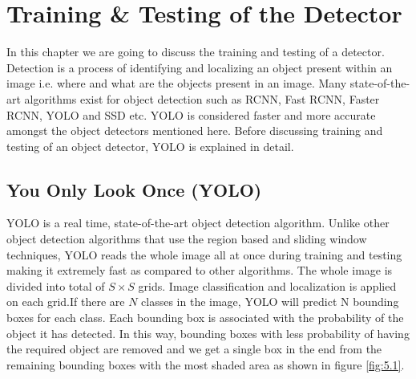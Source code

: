 \chapter{Training \& Testing of the
Detector}
\label{Chapter 5}
In this chapter we are going to discuss the training and testing of a detector. Detection is a process of identifying and localizing an object present within an image i.e. where and what are the objects present in an image. Many state-of-the-art algorithms exist for object detection such as RCNN, Fast RCNN, Faster RCNN, YOLO and SSD etc. YOLO is considered faster and more accurate amongst the object detectors mentioned here. Before discussing training and testing of an object detector, YOLO  is explained in detail.
\section{You Only Look Once (YOLO)}
YOLO is a real time, state-of-the-art object detection algorithm. Unlike other object detection algorithms that use the region based and sliding window techniques, YOLO reads the whole image all at once during training and testing making it extremely fast as compared to other algorithms. The whole image is divided into total of $S \times S$ grids. Image classification and localization is applied on each grid.If there are $N$ classes in the image, YOLO will predict N bounding boxes for each class. Each bounding box is associated with the probability of the object it has detected. In this way, bounding boxes with less probability of having the required object are removed and we get a single box in the end from the remaining bounding boxes with the most shaded area as shown in figure \ref{fig:5.1}.

